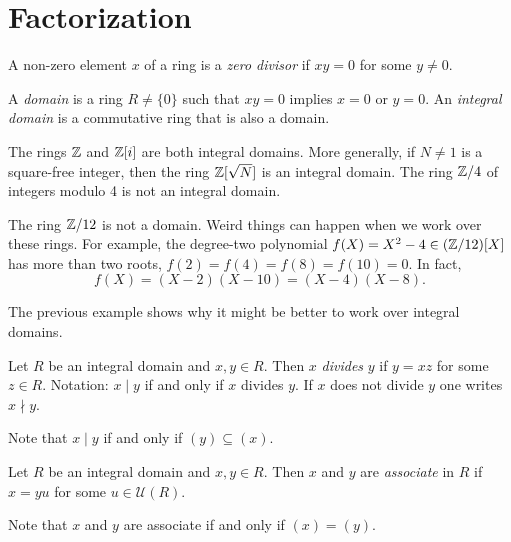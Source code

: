 \section{Factorization}
\lecture\label{lec:Factorization}

\begin{definition}
  A non-zero element $x$ of a ring is
  a \emph{zero divisor} if $xy=0$ for some $y\ne0$. 
\end{definition}

\begin{definition}
    A \emph{domain} is a ring $R\neq\{0\}$ such that $xy=0$ implies $x=0$ or $y=0$. 
    An \emph{integral domain} is a commutative ring that is also a domain. 
\end{definition}

The rings $\mathbb{Z}$ and $\mathbb{Z}[i]$ are both integral domains.  More generally, if $N\ne1$
is a square-free integer, then the ring $\mathbb{Z}[\sqrt{N}]$ is an integral domain.
The ring $\mathbb{Z}/4$ of integers modulo 4 is not an integral domain. 

\begin{example}
    The ring $\mathbb{Z}/12$ is not a domain. Weird things can happen 
    when we work over these rings. For example, the degree-two polynomial 
    $f(X)=X^2-4\in(\mathbb{Z}/12)[X]$ has more than two roots, 
    $f(2)=f(4)=f(8)=f(10)=0$. In fact,
    \[
    f(X)=(X-2)(X-10)=(X-4)(X-8).
    \]
\end{example}

The previous example shows why it might be better 
to work over integral domains. 

\begin{definition}
	Let $R$ be an integral domain and $x,y\in R$. Then $x$ \emph{divides} $y$ 
	if $y=xz$ for some $z\in R$. 
	Notation: $x\mid y$ if and only if $x$ divides $y$. If $x$ does not
	divide $y$ one writes $x\nmid y$.  
\end{definition}

Note that $x\mid y$ if and only if $(y)\subseteq (x)$.
	
\begin{definition}
	Let $R$ be an integral domain and $x,y\in R$. Then $x$ and $y$ are
	\emph{associate} in $R$ if $x=yu$ for some $u\in\mathcal{U}(R)$. 
\end{definition}

Note that $x$ and $y$ are associate if and only if $(x)=(y)$.

